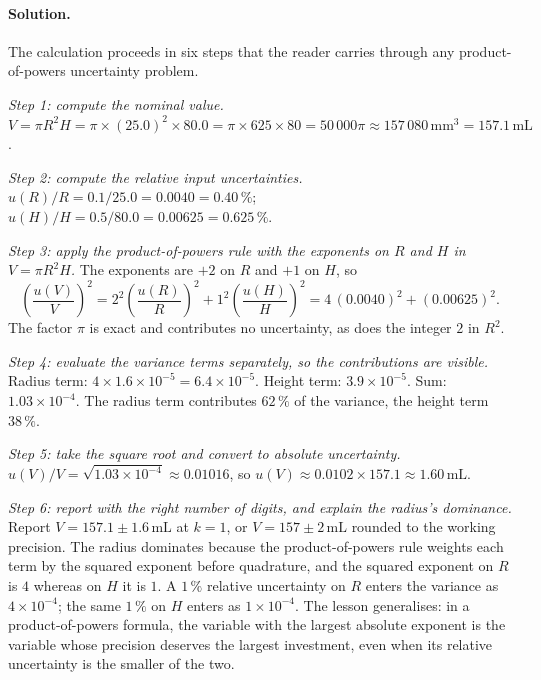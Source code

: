 \paragraph{Solution.}
The calculation proceeds in six steps that the reader carries
through any product-of-powers uncertainty problem.

\emph{Step 1: compute the nominal value.}
$V = \pi R^{2} H = \pi \times (25.0)^{2} \times 80.0 = \pi \times
625 \times 80 = 50\,000\pi \approx 157\,080 \,\si{\milli\meter
\cubed} = 157.1 \,\si{\milli\liter}$.

\emph{Step 2: compute the relative input uncertainties.}
$u(R)/R = 0.1 / 25.0 = 0.0040 = 0.40\,\%$;
$u(H)/H = 0.5 / 80.0 = 0.00625 = 0.625\,\%$.

\emph{Step 3: apply the product-of-powers rule with the
exponents on $R$ and $H$ in $V = \pi R^{2} H$.}
The exponents are $+2$ on $R$ and $+1$ on $H$, so
\[
\left(\frac{u(V)}{V}\right)^{2}
  = 2^{2} \left(\frac{u(R)}{R}\right)^{2}
  + 1^{2} \left(\frac{u(H)}{H}\right)^{2}
  = 4 \, (0.0040)^{2} + (0.00625)^{2}.
\]
The factor $\pi$ is exact and contributes no uncertainty, as does
the integer $2$ in $R^{2}$.

\emph{Step 4: evaluate the variance terms separately, so the
contributions are visible.}
Radius term: $4 \times 1.6 \times 10^{-5} = 6.4 \times 10^{-5}$.
Height term: $3.9 \times 10^{-5}$. Sum: $1.03 \times 10^{-4}$.
The radius term contributes $62\,\%$ of the variance, the height
term $38\,\%$.

\emph{Step 5: take the square root and convert to absolute
uncertainty.}
$u(V)/V = \sqrt{1.03 \times 10^{-4}} \approx 0.01016$, so
$u(V) \approx 0.0102 \times 157.1 \approx 1.60 \,\si{\milli
\liter}$.

\emph{Step 6: report with the right number of digits, and explain
the radius's dominance.}
Report $V = 157.1 \pm 1.6 \,\si{\milli\liter}$ at $k = 1$, or
$V = 157 \pm 2 \,\si{\milli\liter}$ rounded to the working
precision. The radius dominates because the product-of-powers rule
weights each term by the squared exponent before quadrature, and
the squared exponent on $R$ is $4$ whereas on $H$ it is $1$. A
$1\,\%$ relative uncertainty on $R$ enters the variance as
$4 \times 10^{-4}$; the same $1\,\%$ on $H$ enters as $1 \times
10^{-4}$. The lesson generalises: in a product-of-powers formula,
the variable with the largest absolute exponent is the variable
whose precision deserves the largest investment, even when its
relative uncertainty is the smaller of the two.

